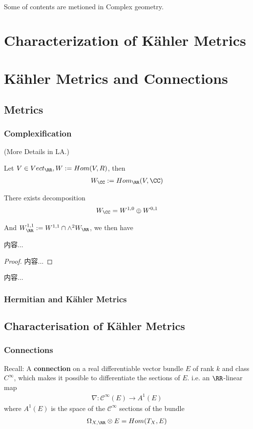 \documentclass[Total.tex]{subfiles}
\begin{document}
	Some of contents are metioned in Complex geometry.
	
	\section{Characterization of Kähler Metrics}
	\section{Kähler Metrics and Connections}
	\subsection{Metrics}
	\subsubsection{Complexification}
	
	(More Details in LA.)
	
	Let $V\in Vect_\RR,W:=Hom(V,R)$, then
	\begin{gather*}
		W_\CC:=Hom_\RR(V,\CC)
	\end{gather*}
	
	There exists decomposition
	\begin{gather*}
		W_\CC=W^{1,0}\oplus W^{0,1}
	\end{gather*}
	
	And $W_\RR^{1,1}:=W^{1,1}\cap \wedge^2 W_\RR$, we then have
	\begin{lemma}
		内容...
	\end{lemma}
	\begin{proof}
		内容...
	\end{proof}
	
	\begin{Def}
		内容...
	\end{Def}
	\subsubsection{Hermitian and K\"{a}hler Metrics}
	\subsection{Characterisation of K\"{a}hler Metrics}
	\subsubsection{Connections}
	\begin{Def}
		Recall: A \textbf{connection} on a real differentiable vector bundle $E$ of rank $k$ and class $C^\infty$, which makes it possible to differentiate the sections of $E$. i.e. an $\RR$-linear map
		\begin{gather*}
			\nabla:\mathcal{C}^\infty(E)\rightarrow A^1(E)
		\end{gather*}
		where $A^1(E)$ is the space of the $\mathcal{C}^\infty$ sections of the bundle
		\begin{gather*}
			\Omega_{X,\RR}\otimes E=Hom(T_X,E)
		\end{gather*}
	\end{Def}
	
\end{document}
